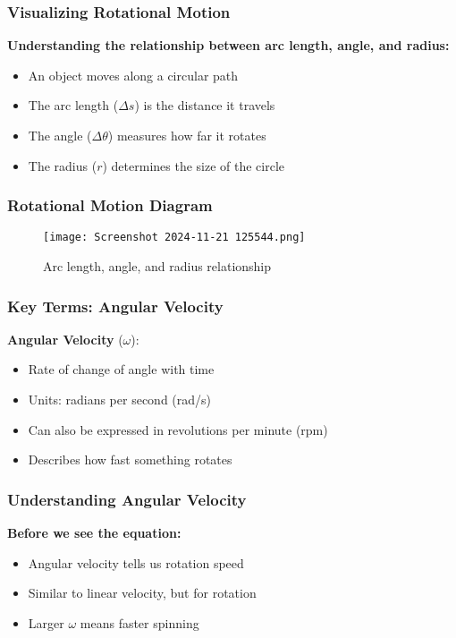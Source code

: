 \documentclass{beamer}
\begin{document}
\begin{frame}
\frametitle{Visualizing Rotational Motion}
\textbf{Understanding the relationship between arc length, angle, and radius:}
\pause
\begin{itemize}
    \item An object moves along a circular path
    \pause
    \item The arc length ($\Delta s$) is the distance it travels
    \pause
    \item The angle ($\Delta\theta$) measures how far it rotates
    \pause
    \item The radius ($r$) determines the size of the circle
\end{itemize}
\end{frame}

\begin{frame}
\frametitle{Rotational Motion Diagram}
\begin{figure}[H]
    \centering
    \texttt{[image: Screenshot 2024-11-21 125544.png]}
    \caption{Arc length, angle, and radius relationship}
\end{figure}
\end{frame}

\begin{frame}
\frametitle{Key Terms: Angular Velocity}
\pause
\textbf{Angular Velocity} ($\omega$):
\begin{itemize}
    \item Rate of change of angle with time
    \pause
    \item Units: radians per second (rad/s)
    \pause
    \item Can also be expressed in revolutions per minute (rpm)
    \pause
    \item Describes how fast something rotates
\end{itemize}
\end{frame}

\begin{frame}
\frametitle{Understanding Angular Velocity}
\textbf{Before we see the equation:}
\pause
\begin{itemize}
    \item Angular velocity tells us rotation speed
    \pause
    \item Similar to linear velocity, but for rotation
    \pause
    \item Larger $\omega$ means faster spinning
\end{itemize}
\end{frame}
\end{document}
